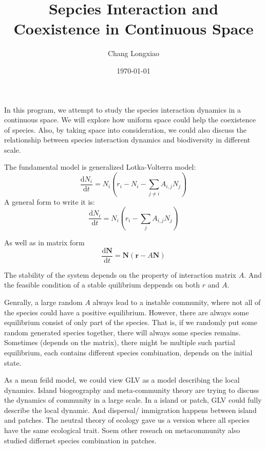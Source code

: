 \documentclass[12pt, a4paper]{article}
\title{Sepcies Interaction and Coexistence in Continuous Space}
\author{Chang Longxiao}
\date{\today}
\begin{document}
\maketitle
\tableofcontents

In this program, we attempt to study the species interaction dynamics in a continuous space. We will explore how uniform space could help the coexistence of species. Also, by taking space into consideration, we could also discuss the relationship between species interaction dynamics and biodiversity in different scale.

The fundamental model is generalized Lotka-Volterra model:
\begin{equation*}
    \frac{\mathrm{d}N_i}{\mathrm{d}t}
    = N_i \left( r_i - N_i - \sum_{j\neq i} A_{i,j} N_j \right)
\end{equation*}
A general form to write it is:
\begin{equation}
    \frac{\mathrm{d}N_i}{\mathrm{d}t}
= N_i \left( r_i - \sum_{j} A_{i,j} N_j \right)
\end{equation}

As well as in matrix form
\begin{equation*}
    \frac{\mathrm{d}\bm{N}}{\mathrm{d}t}
= \bm{N} \left( \bm{r} - A \bm{N} \right)
\end{equation*}

The stability of the system depends on the property of interaction matrix $A$. And the feasible condition of a stable quilibrium deppends on both $r$ and $A$.

Genrally, a large random $A$ always lead to a instable community, where not all of the species could have a positive equilibrium. However, there are always some equilibrium consist of only part of the species. That is, if we randomly put some random generated species together, there will always some species remains. Sometimes (depends on the matrix), there might be multiple such partial equilibrium, each contains different species combination, depends on the initial state.

As a mean feild model, we could view GLV as a model describing the local dynamics. Island biogeography and meta-community theory are trying to discuss the dynamics of community in a large scale. In a island or patch, GLV could fully describe the local dynamic. And dispersal/ immigration happens between island and patches. The neutral theory of ecology gave us a version where all species have the same ecological trait. Soem other reseach on metacommunity also studied differnet species combination in patches.
\end{document}
